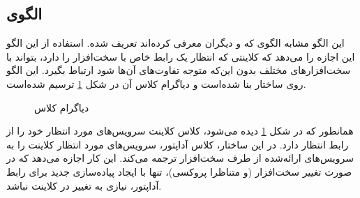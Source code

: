 \subsection{الگوی }
\label{HWAdapterSec}
\begin{RTL}
این الگو مشابه الگوی  که  و دیگران
\cite{ref3} معرفی کرده‌اند تعریف شده. استفاده از این الگو این اجازه را
می‌دهد که کلاینتی که انتظار یک رابط خاص با سخت‌افزار را دارد، بتواند با
سخت‌افزارهای مختلف بدون این‌که متوجه تفاوت‌های آن‌ها شود ارتباط بگیرد.
این الگو روی ساختار  بنا شده‌است و
دیاگرام کلاس آن در شکل \ref{HWAdapterClassDiag} ترسیم شده‌است.
\end{RTL}
\begin{figure}[h!]
\centering
{}
\caption{دیاگرام کلاس }
\label{HWAdapterClassDiag}
\end{figure}
\begin{RTL}
همانطور که در شکل \ref{HWAdapterClassDiag} دیده می‌شود،
کلاس کلاینت سرویس‌های مورد انتظار خود را از رابط
 انتظار دارد.
در این ساختار، کلاس آداپتور، سرویس‌های مورد انتظار کلاینت را به سرویس‌های ارائه‌شده
از طرف سخت‌افزار ترجمه می‌کند. این کار اجازه می‌دهد که در صورت تغییر سخت‌افزار
(و متناظرا پروکسی)، تنها با ایجاد پیاده‌سازی جدید برای رابط آداپتور، نیازی به تغییر
در کلاینت نباشد.
\end{RTL}